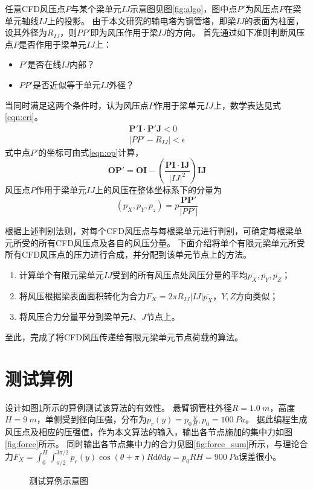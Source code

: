 \documentclass{ctexart}
\begin{document}
任意CFD风压点$P$与某个梁单元$IJ$示意图见图\ref{fig:algo}，图中点$P'$为风压点$P$在梁单元轴线$IJ$上的投影。
由于本文研究的输电塔为钢管塔，即梁$IJ$的表面为柱面，设其外径为$R_{IJ}$，则$PP'$即为风压作用于梁$IJ$的方向。
首先通过如下准则判断风压点$P$是否作用于梁单元$IJ$上：
\begin{itemize}
	\item $P'$是否在线$IJ$内部？
    \item $PP'$是否近似等于单元$IJ$外径？
\end{itemize}
当同时满足这两个条件时，认为风压点$P$作用于梁单元$IJ$上，数学表达见式\eqref{eqn:cri}。
\begin{gather}\label{eqn:cri}
\bm{P'I}\cdot\bm{P'J} < 0  \nonumber \\
|PP'-R_{IJ}| < \epsilon
\end{gather}
式中点$P'$的坐标可由式\eqref{eqn:op}计算，
\begin{equation}\label{eqn:op}
\bm{OP'}=\bm{OI} - \left( \frac{\bm{PI}\cdot\bm{IJ}}{|IJ|^2} \right)\bm{IJ}
\end{equation}
风压点$P$作用于梁单元$IJ$上的风压在整体坐标系下的分量为
\begin{equation}
(p_X, p_Y, p_z) = p\frac{\bm{PP'}}{|PP'|}
\end{equation}

根据上述判别法则，对每个CFD风压点与每根梁单元进行判别，可确定每根梁单元所受的所有CFD风压点及各自的风压分量。
下面介绍将单个有限元梁单元所受所有CFD风压点的压力进行合成，并分配到该单元节点上的方法。
\begin{enumerate}
\item 计算单个有限元梁单元$IJ$受到的所有风压点处风压分量的平均$\bar{p_X},\bar{p_Y},\bar{p_Z}$；
\item 将风压根据梁表面面积转化为合力$F_X=2\pi R_{IJ} |IJ| \bar{p_X}$，$Y,Z$方向类似；
\item 将风压合力分量平分到梁单元$I$、$J$节点上。
\end{enumerate}
至此，完成了将CFD风压传递给有限元梁单元节点荷载的算法。

\newpage

\section{测试算例}
设计如图\ref{fig:example}所示的算例测试该算法的有效性。
悬臂钢管柱外径$R=\SI{1.0}{m}$，高度$H=\SI{9}{m}$，单侧受到径向压强，分布为$p_r(y)=p_0\frac{y}{H},p_0=\SI{100}{Pa}$。
据此编程生成风压点及相应的压强值，作为本文算法的输入，输出各节点施加的集中力如图\ref{fig:force}所示。
同时输出各节点集中力的合力见图\ref{fig:force_sum}所示，与理论合力$F_X = \int_{0}^{H}\int_{\pi/2}^{3\pi/2}p_r(y)\cos(\theta+\pi)R \mathrm{d} \theta \mathrm{d} y = p_0 RH=\SI{900}{Pa}$误差很小。
\begin{figure}[!htbp]
    \centering
    
    \caption{测试算例示意图}
    \label{fig:example}
\end{figure}
\end{document}
